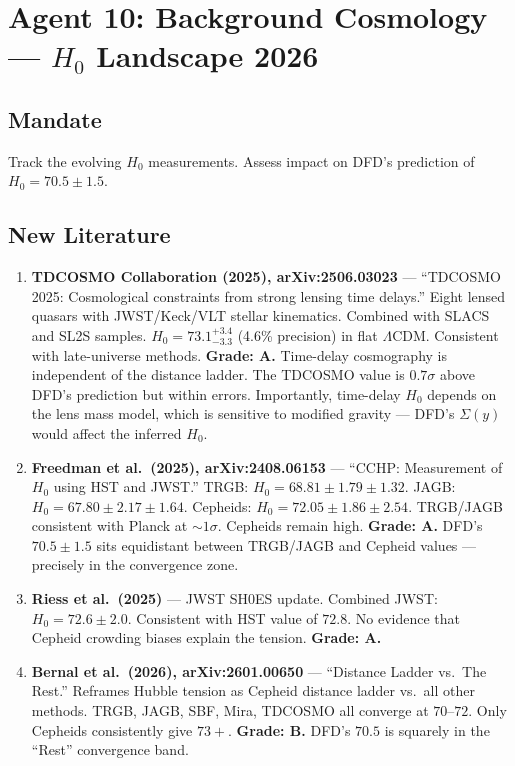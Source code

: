 \documentclass[11pt,a4paper]{article}
\begin{document}
\section{Agent 10: Background Cosmology --- $H_0$ Landscape 2026}

\subsection{Mandate}
Track the evolving $H_0$ measurements. Assess impact on DFD's prediction of $H_0 = 70.5 \pm 1.5$.

\subsection{New Literature}

\begin{enumerate}

\item \textbf{TDCOSMO Collaboration (2025), arXiv:2506.03023} --- ``TDCOSMO 2025: Cosmological constraints from strong lensing time delays.'' Eight lensed quasars with JWST/Keck/VLT stellar kinematics. Combined with SLACS and SL2S samples. $H_0 = 73.1^{+3.4}_{-3.3}$ (4.6\% precision) in flat $\Lambda$CDM. Consistent with late-universe methods. \textbf{Grade: A.} Time-delay cosmography is independent of the distance ladder. The TDCOSMO value is $0.7\sigma$ above DFD's prediction but within errors. Importantly, time-delay $H_0$ depends on the lens mass model, which is sensitive to modified gravity --- DFD's $\Sigma(y)$ would affect the inferred $H_0$.

\item \textbf{Freedman et al.\ (2025), arXiv:2408.06153} --- ``CCHP: Measurement of $H_0$ using HST and JWST.'' TRGB: $H_0 = 68.81 \pm 1.79 \pm 1.32$. JAGB: $H_0 = 67.80 \pm 2.17 \pm 1.64$. Cepheids: $H_0 = 72.05 \pm 1.86 \pm 2.54$. TRGB/JAGB consistent with Planck at $\sim 1\sigma$. Cepheids remain high. \textbf{Grade: A.} DFD's $70.5 \pm 1.5$ sits equidistant between TRGB/JAGB and Cepheid values --- precisely in the convergence zone.

\item \textbf{Riess et al.\ (2025)} --- JWST SH0ES update. Combined JWST: $H_0 = 72.6 \pm 2.0$. Consistent with HST value of $72.8$. No evidence that Cepheid crowding biases explain the tension. \textbf{Grade: A.}

\item \textbf{Bernal et al.\ (2026), arXiv:2601.00650} --- ``Distance Ladder vs.\ The Rest.'' Reframes Hubble tension as Cepheid distance ladder vs.\ all other methods. TRGB, JAGB, SBF, Mira, TDCOSMO all converge at $70$--$72$. Only Cepheids consistently give $73+$. \textbf{Grade: B.} DFD's $70.5$ is squarely in the ``Rest'' convergence band.

\end{enumerate}
\end{document}
